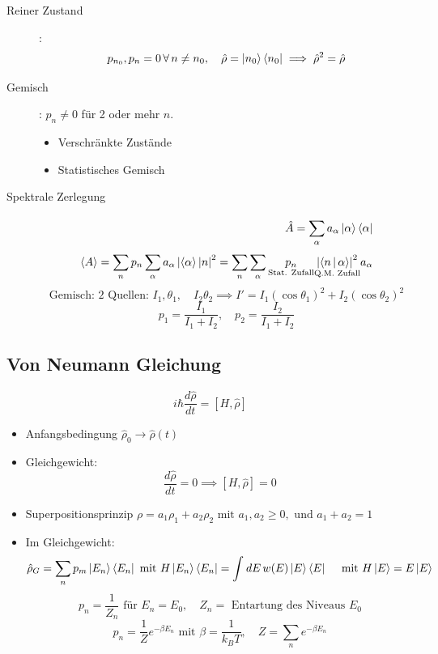 \documentclass[11pt]{article}
\theoremstyle{plain}
\newcommand{\abs}[1]{\left| #1 \right|}
\begin{document}
\begin{description}
  \item[Reiner Zustand]: \[ p_{n_0}, p_n =0 \,\forall\, n \neq n_0, \quad  \hat{\rho}= \Ket{n_0}\Bra{n_0} \implies \hat{\rho}^2=\hat{\rho} \]  
  \item[Gemisch]: $p_n \neq 0 $ f\"ur 2 oder mehr $n$.
    \begin{itemize}
      \item Verschr\"ankte Zust\"ande
      \item Statistisches Gemisch
    \end{itemize}
  \item[Spektrale Zerlegung] \begin{align*}
    \hat{A} = \sum_{\alpha}^{}a_ \alpha \Ket{\alpha}\Bra{\alpha} \\
    \Braket{A}= \sum_{n}^{}p_n \sum_{\alpha}^{}a_ \alpha \abs{\Braket{\alpha}| n}^2
    = \sum_{n}^{}\sum_{\alpha}^{} \underset{\text{Stat. Zufall}}{p_n} \underset{\text{Q.M. Zufall}}{\abs{\Braket{n|\alpha}}^2} a_ \alpha
  \end{align*}
  \[ \text{Gemisch: 2 Quellen: } I_1, \theta_1, \quad I_2 \theta_2 \implies 
  I'= I_1 ( \cos{\theta_1})^2 + I_2 (\cos{\theta_2})^2 \] 
  \[ p_1 = \frac{I_1}{I_1 + I_2}, \quad p_2 = \frac{I_2}{I_1 + I_2} \] 
\end{description}
\subsection*{Von Neumann Gleichung}
\[ i \hbar \frac{d\hat{\rho}}{dt} = \left[ H, \hat{\rho} \right] \] 
\begin{itemize}
  \item Anfangsbedingung $\hat{\rho}_0 \to  \hat{\rho}(t)$
  \item Gleichgewicht: \[ \frac{d \hat{\rho}}{dt}=0 \implies  \left[ H, \hat{\rho} \right]=0  \] 
  \item Superpositionsprinzip $\rho= a_1 \rho_1 + a_2 \rho_2 \text{ mit } a_1, a_2 \ge 0,
    \text{ und } a_1+a_2 =1 $
  \item Im Gleichgewicht: \[ \hat{\rho}_G = \sum_{n}^{} p_m \Ket{E_n}\Bra{E_n} \text{ mit }
      H \Ket{E_n}\Bra{E_n} = \int_{}^{} dE\, w(E)\Ket{E}\Bra{E} \quad \text{ mit }
    H \Ket{E}= E \Ket{E}\] 
    \[ p_n = \frac{1}{Z_n} \text{ f\"ur } E_n = E_0, \quad Z_n= \text{ Entartung des Niveaus } E_0 \] 
    \[ p_n = \frac{1}{Z} e^{-\beta E_n} \text{ mit } 
    \beta= \frac{1}{k_B T}, \quad Z=\sum_{n}^{} e^{-\beta E_n} \] 
\end{itemize}
\end{document}
